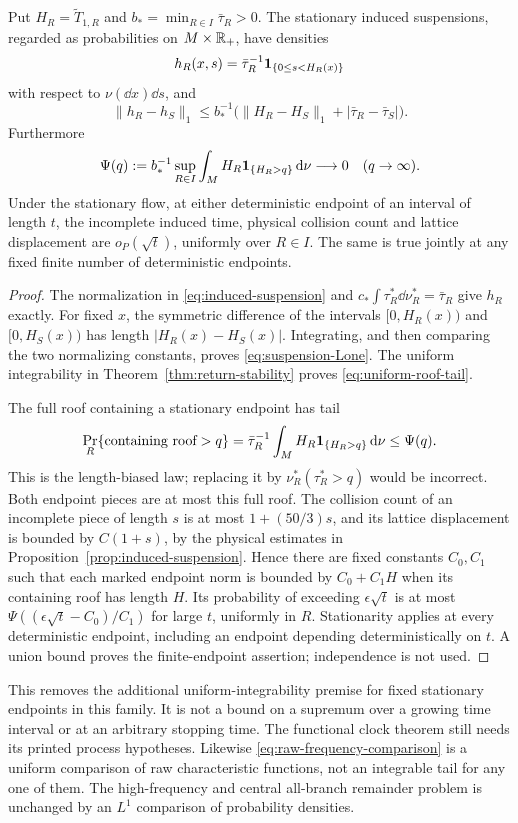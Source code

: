 \begin{corollary}
\label{cor:uniform-stationary-endpoints}
Put $H_R=\widetilde T_{1,R}$ and
$b_*=\min_{R\in I}\bar\tau_R>0$. The stationary induced suspensions,
regarded as probabilities on $M\times\mathbb R_+$, have densities
\[
 h_R(x,s)=\bar\tau_R^{-1}\mathbf1_{\{0\le s<H_R(x)\}}
\]
with respect to $\nu(\dd x)\dd s$, and
\begin{equation}\label{eq:suspension-Lone}
 \|h_R-h_S\|_1\le
 b_*^{-1}\bigl(\|H_R-H_S\|_1+|\bar\tau_R-\bar\tau_S|\bigr).
\end{equation}
Furthermore
\begin{equation}\label{eq:uniform-roof-tail}
 \Psi(q):=b_*^{-1}\sup_{R\in I}
                   \int_M H_R\one_{\{H_R>q\}}\dd\nu
             \longrightarrow0\quad(q\to\infty).
\end{equation}
Under the stationary flow, at either deterministic endpoint of an
interval of length $t$, the incomplete induced time, physical collision
count and lattice displacement are $o_P(\sqrt t)$, uniformly over
$R\in I$. The same is true jointly at any fixed finite number of
deterministic endpoints.
\end{corollary}
\begin{proof}
The normalization in \eqref{eq:induced-suspension} and
$c_*\int\tau_R^*\dd\nu_R^*=\bar\tau_R$ give $h_R$ exactly.
For fixed $x$, the symmetric difference of the intervals
$[0,H_R(x))$ and $[0,H_S(x))$ has length $|H_R(x)-H_S(x)|$.
Integrating, and then comparing the two normalizing constants, proves
\eqref{eq:suspension-Lone}. The uniform integrability in
Theorem~\ref{thm:return-stability} proves
\eqref{eq:uniform-roof-tail}.

The full roof containing a stationary endpoint has tail
\[
 \Pr_R\{\text{containing roof}>q\}
 =\bar\tau_R^{-1}\int_MH_R\mathbf1_{\{H_R>q\}}\,\mathrm d\nu
 \le\Psi(q).
\]
This is the length-biased law; replacing it by
$\nu_R^*(\tau_R^*>q)$ would be incorrect. Both endpoint pieces
are at most this full roof. The collision count of an incomplete
piece of length $s$ is at most $1+(50/3)s$, and its lattice
displacement is bounded by $C(1+s)$, by the physical estimates in
Proposition~\ref{prop:induced-suspension}. Hence there are fixed
constants $C_0,C_1$ such that each marked endpoint norm is bounded
by $C_0+C_1H$ when its containing roof has length $H$. Its probability of exceeding
$\epsilon\sqrt t$ is at most
$\Psi((\epsilon\sqrt t-C_0)/C_1)$ for large $t$, uniformly in $R$.
Stationarity applies at every deterministic endpoint, including an
endpoint depending deterministically on $t$. A union bound proves
the finite-endpoint assertion; independence is not used.
\end{proof}

This removes the additional uniform-integrability premise for fixed
stationary endpoints in this family. It is not a bound on a supremum
over a growing time interval or at an arbitrary stopping time. The
functional clock theorem still needs its printed process hypotheses.
Likewise \eqref{eq:raw-frequency-comparison} is a uniform comparison
of raw characteristic functions, not an integrable tail for any one
of them. The high-frequency and central all-branch remainder problem
is unchanged by an $L^1$ comparison of probability densities.
